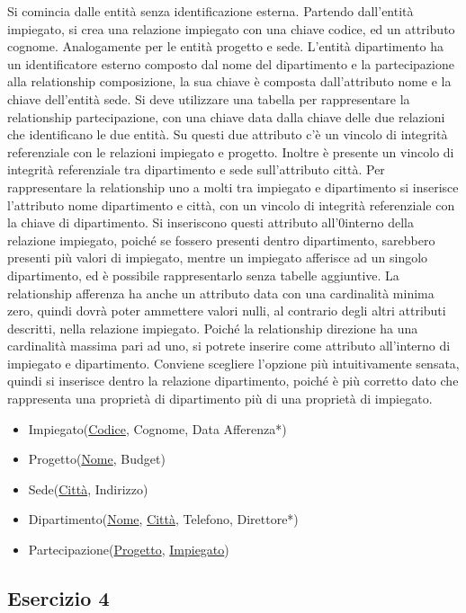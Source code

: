 \documentclass{article}
\numberwithin{equation}{subsection}
\begin{document}
Si comincia dalle entità senza identificazione esterna. Partendo dall'entità impiegato, si crea una relazione impiegato con una chiave codice, 
ed un attributo cognome. Analogamente per le entità progetto e sede. L'entità dipartimento ha un identificatore esterno composto dal nome del dipartimento e 
la partecipazione alla relationship composizione, la sua chiave è composta dall'attributo nome e la chiave dell'entità sede. Si deve utilizzare una tabella 
per rappresentare la relationship partecipazione, con una chiave data dalla chiave delle due relazioni che identificano le due entità. Su questi 
due attributo c'è un vincolo di integrità referenziale con le relazioni impiegato e progetto. Inoltre è presente un vincolo 
di integrità referenziale tra dipartimento e sede sull'attributo città. Per rappresentare la relationship uno a molti tra impiegato e 
dipartimento si inserisce l'attributo nome dipartimento e città, con un vincolo di integrità referenziale con la chiave di dipartimento. Si 
inseriscono questi attributo all'0interno della relazione impiegato, poiché se fossero presenti dentro dipartimento, sarebbero presenti 
più valori di impiegato, mentre un impiegato afferisce ad un singolo dipartimento, ed è possibile rappresentarlo senza tabelle aggiuntive. 
La relationship afferenza ha anche un attributo data con una cardinalità minima zero, quindi dovrà poter ammettere valori nulli, al contrario 
degli altri attributi descritti, nella relazione impiegato. Poiché la relationship direzione ha una cardinalità massima pari ad uno, si potrete 
inserire come attributo all'interno di impiegato e dipartimento. Conviene scegliere l'opzione più intuitivamente sensata, quindi si inserisce dentro 
la relazione dipartimento, poiché è più corretto dato che rappresenta una proprietà di dipartimento più di una proprietà di impiegato. 

\begin{itemize}
    \item Impiegato(\underline{Codice}, Cognome, Data Afferenza*)
    \item Progetto(\underline{Nome}, Budget)
    \item Sede(\underline{Città}, Indirizzo)
    \item Dipartimento(\underline{Nome}, \underline{Città}, Telefono, Direttore*)
    \item Partecipazione(\underline{Progetto}, \underline{Impiegato})
\end{itemize}

\subsection{Esercizio 4}
\end{document}
